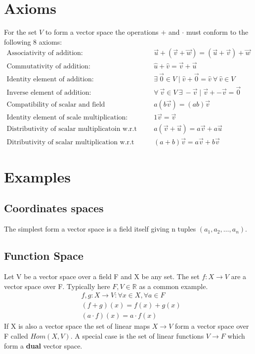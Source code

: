 \documentclass[a4paper]{article}
\begin{document}
\section{Axioms}
For the set $V$ to form a vector space the operations $+$ and $\cdot$ must conform to the following 8 axioms:
\begin{align}
  \text{Associativity of addition: } &\vec{u}+(\vec{v}+\vec{w}) = (\vec{u}+\vec{v})+\vec{w}\\
  \text{Commutativity of addition: }&\hat{u}+\hat{v} = \vec{v}+\vec{u}\\
  \text{Identity element of addition: }&\exists\:\vec{0}\in V \mid \hat{v} + \vec{0} = \hat{v} \:\forall \: \hat{v}\in V\\
  \text{Inverse element of addition: } &\forall \: \vec{v}\in V\: \exists \: -\vec{v} \mid \vec{v} + -\vec{v}=\vec{0}\\
  \text{Compatibility of scalar and field multiplication: }& a(b \vec{v}) = (ab) \vec{v}\\
  \text{Identity element of scale multiplication: }& 1 \vec{v} = \vec{v}\\
  \text{Distributivity of scalar multiplicatoin w.r.t vector addition: } &a(\vec{v}+\vec{u})= a\vec{v}+a\vec{u}\\
  \text{Ditributivity of scalar multiplication w.r.t field addition: }&(a+b)\vec{v} = a\vec{v}+b\vec{v}
\end{align}
\section{Examples}
\subsection{Coordinates spaces}
The simplest form a vector space is a field itself giving n tuples $(a_1, a_2, \dots, a_n)$.
\subsection{Function Space}
Let V be a vector space over a field F and X be any set. The set $f:X \to V$ are a vector space over F. Typically here $F,V \in \mathbb{R}$ as a common example.
\begin{align}
  &f,g:X \to V:\forall x \in X, \forall a \in F\\
  &(f+g)(x)=f(x)+g(x)\\
  &(a\cdot f)(x)=a \cdot f(x)
\end{align}
If X is also a vector space the set of linear maps $X \to V$ form a vector space over F called $Hom(X,V)$. A special case is the set of linear functions $V \to F$ which form a \textbf{dual} vector space.\\ \\
\end{document}
